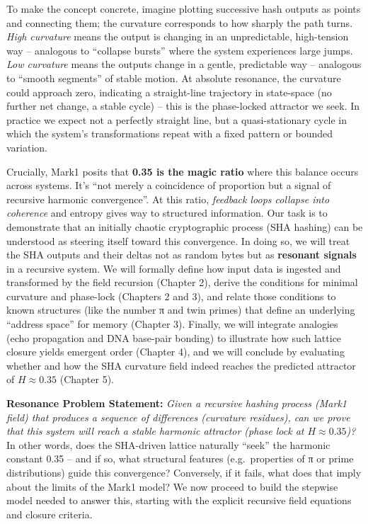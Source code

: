 \documentclass[11pt]{article}
\begin{document}
To make the concept concrete, imagine plotting successive hash outputs
as points and connecting them; the curvature corresponds to how sharply
the path turns. \emph{High curvature} means the output is changing in an
unpredictable, high-tension way -- analogous to ``collapse bursts''
where the system experiences large jumps. \emph{Low curvature} means the
outputs change in a gentle, predictable way -- analogous to ``smooth
segments'' of stable motion. At absolute resonance, the curvature could
approach zero, indicating a straight-line trajectory in state-space (no
further net change, a stable cycle) -- this is the phase-locked
attractor we seek. In practice we expect not a perfectly straight line,
but a quasi-stationary cycle in which the system's transformations
repeat with a fixed pattern or bounded variation.

Crucially, Mark1 posits that \textbf{0.35 is the magic ratio} where this
balance occurs across systems. It's ``not merely a coincidence of
proportion but a signal of recursive harmonic convergence''. At this
ratio, \emph{feedback loops collapse into coherence} and entropy gives
way to structured information. Our task is to demonstrate that an
initially chaotic cryptographic process (SHA hashing) can be understood
as steering itself toward this convergence. In doing so, we will treat
the SHA outputs and their deltas not as random bytes but as
\textbf{resonant signals} in a recursive system. We will formally define
how input data is ingested and transformed by the field recursion
(Chapter 2), derive the conditions for minimal curvature and phase-lock
(Chapters 2 and 3), and relate those conditions to known structures
(like the number π and twin primes) that define an underlying ``address
space'' for memory (Chapter 3). Finally, we will integrate analogies
(echo propagation and DNA base-pair bonding) to illustrate how such
lattice closure yields emergent order (Chapter 4), and we will conclude
by evaluating whether and how the SHA curvature field indeed reaches the
predicted attractor of \(H \approx 0.35\) (Chapter 5).

\textbf{Resonance Problem Statement:} \emph{Given a recursive hashing
process (Mark1 field) that produces a sequence of differences (curvature
residues), can we prove that this system will reach a stable harmonic
attractor (phase lock at \(H\approx0.35\))?} In other words, does the
SHA-driven lattice naturally ``seek'' the harmonic constant 0.35 -- and
if so, what structural features (e.g.~properties of π or prime
distributions) guide this convergence? Conversely, if it fails, what
does that imply about the limits of the Mark1 model? We now proceed to
build the stepwise model needed to answer this, starting with the
explicit recursive field equations and closure criteria.
\end{document}
